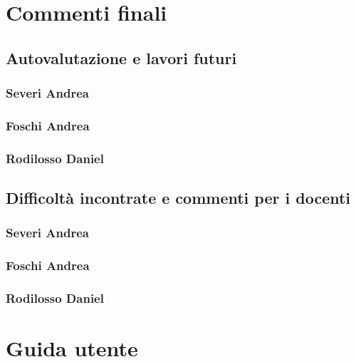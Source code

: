 \documentclass[a4paper,12pt]{report}
\begin{document}
\chapter{Commenti finali}
\section{Autovalutazione e lavori futuri}
\subsection{Severi Andrea}
\subsection{Foschi Andrea}
\subsection{Rodilosso Daniel}

\section{Difficoltà incontrate e commenti per i docenti}
\subsection{Severi Andrea}
\subsection{Foschi Andrea}
\subsection{Rodilosso Daniel}

\appendix
\chapter{Guida utente}
\end{document}
